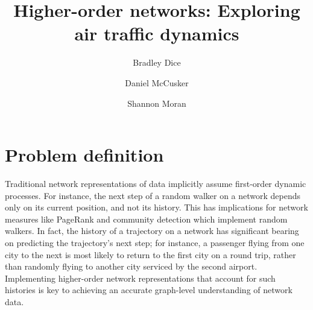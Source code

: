 \documentclass[sigconf]{acmart}
\begin{document}
\title{Higher-order networks: Exploring air traffic dynamics}

\author{Bradley Dice}

\author{Daniel McCusker}

\author{Shannon Moran}

\renewcommand{\shortauthors}{Dice, et al.}




\maketitle

\section{Problem definition}
Traditional network representations of data implicitly assume first-order dynamic processes. For instance, the next step of a random walker on a network depends only on its current position, and not its history. This has implications for network measures like PageRank and community detection which implement random walkers. In fact, the history of a trajectory on a network has significant bearing on predicting the trajectory's next step; for instance, a passenger flying from one city to the next is most likely to return to the first city on a round trip, rather than randomly flying to another city serviced by the second airport. Implementing higher-order network representations that account for such histories is key to achieving an accurate graph-level understanding of network data. 
\end{document}
